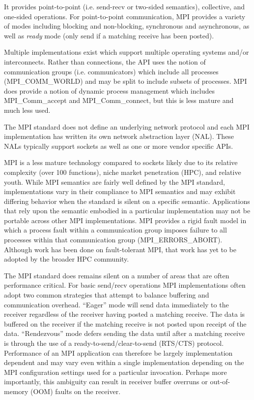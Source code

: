 It provides point-to-point (i.e. send-recv or two-sided semantics), collective, and
one-sided operations. For point-to-point communication, MPI provides a variety of modes
including blocking and non-blocking, synchronous and asynchronous, as well as \emph{ready}
mode (only send if a matching receive has been posted).

Multiple implementations exist\cite{ompi, mpich2, mvapich, intel-mpi, platform-mpi}
which support multiple operating systems and/or interconnects.  Rather than connections,
the API uses the notion of communication groups (i.e.  communicators) which include all
processes (MPI\_COMM\_WORLD) and may be split to include subsets of processes. MPI does
provide a notion of dynamic process management which includes MPI\_Comm\_accept and
MPI\_Comm\_connect, but this is less mature and much less used.

The MPI standard does not define an underlying network protocol and each MPI
implementation has written its own network abstraction layer (NAL). These NALs typically
support sockets as well as one or more vendor specific APIs.

MPI is a less mature technology compared to sockets likely due to its
relative complexity (over 100 functions), niche market penetration
(HPC), and relative youth. While MPI semantics are fairly well defined
by the MPI standard, implementations vary in their compliance to MPI
semantics and may exhibit differing behavior when the standard is
silent on a specific semantic. Applications that rely upon the
semantic embodied in a particular implementation may not be portable
across other MPI implementations. MPI provides a rigid fault model in
which a process fault within a communication group imposes failure to
all processes within that communication group
(MPI\_ERRORS\_ABORT). Although work has been done on fault-tolerant
MPI\cite{ft-mpi, mpi-ft}, that work has yet to be adopted by the
broader HPC community. 

The MPI standard does remains silent on a number of areas that are
often performance critical. For basic send/recv operations MPI
implementations often adopt two common strategies that attempt to
balance buffering and communication overhead. ``Eager'' mode will send
data immediately to the receiver regardless of the receiver having
posted a matching receive. The data is buffered on the receiver if the
matching receive is not posted upon receipt of the
data. ``Rendezvous'' mode defers sending the data until after a
matching receive is through the use of a ready-to-send/clear-to-send
(RTS/CTS) protocol. Performance of an MPI application can therefore be
largely implementation dependent and may vary even within a single
implementation depending on the MPI configuration settings used for a
particular invocation. Perhaps more importantly, this ambiguity can
result in receiver buffer overruns or out-of-memory (OOM) faults on
the receiver. 

